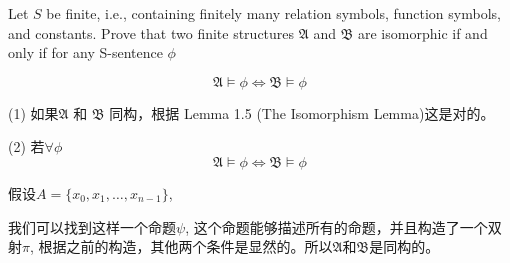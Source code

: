 \documentclass{ximera}
\begin{document}
\begin{problem} Let $S$ be finite, i.e., containing finitely many relation symbols, function symbols, and
    constants. Prove that two finite structures $\mathfrak{A}$ and $\mathfrak{B}$ are isomorphic if and only if for any S-sentence
    $\phi$

    $$\mathfrak{A} \models \phi \Leftrightarrow \mathfrak{B} \models \phi$$
    
    \begin{solution}
        (1) 如果$\mathfrak{A}$ 和 $\mathfrak{B}$ 同构，根据 Lemma 1.5 (The Isomorphism Lemma)这是对的。

        (2) 若$\forall \phi$
        $$\mathfrak{A} \models \phi \Leftrightarrow \mathfrak{B} \models \phi$$

        假设$A = \{x_0, x_1, \dots ,x_{n-1}\}$,

        我们可以找到这样一个命题$\psi$, 这个命题能够描述所有的命题，并且构造了一个双射$\pi$, 根据之前的构造，其他两个条件是显然的。所以$\mathfrak{A}$和$\mathfrak{B}$是同构的。

        
    \end{solution}
\end{problem}
\end{document}
